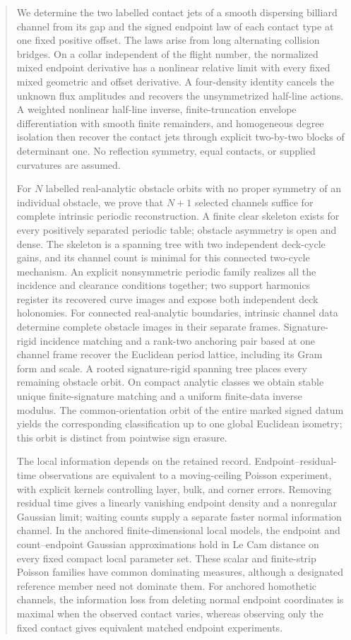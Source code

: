 \begin{abstract}
We determine the two labelled contact jets of a smooth dispersing billiard
channel from its gap and the signed endpoint law of each contact type at
one fixed positive offset.  The laws arise from long alternating collision
bridges.  On a collar independent of the flight number, the normalized
mixed endpoint derivative has a nonlinear relative limit with every fixed
mixed geometric and offset derivative.  A four-density identity cancels
the unknown flux amplitudes and recovers the unsymmetrized half-line
actions.  A weighted nonlinear half-line inverse, finite-truncation
envelope differentiation with smooth finite remainders, and homogeneous
degree isolation then recover the contact jets through explicit
two-by-two blocks of determinant one.  No reflection symmetry, equal
contacts, or supplied curvatures are assumed.

For $N$ labelled real-analytic obstacle orbits with no proper symmetry of an individual
obstacle, we prove that $N+1$ selected channels suffice for complete intrinsic
periodic reconstruction.  A finite clear skeleton exists for every
positively separated periodic table; obstacle asymmetry is open and dense.
The skeleton is a spanning tree with two independent deck-cycle gains, and
its channel count is minimal for this connected two-cycle mechanism.
An explicit nonsymmetric periodic family realizes all the incidence and
clearance conditions together; two support harmonics register its recovered
curve images and expose both independent deck holonomies.
For connected real-analytic boundaries, intrinsic channel data determine
complete obstacle images in their separate frames.  Signature-rigid incidence
matching and a rank-two anchoring pair based at one channel frame recover
the Euclidean period lattice, including its Gram form and scale.  A rooted
signature-rigid spanning tree places every remaining obstacle orbit.  On compact analytic
classes we obtain stable unique finite-signature matching and a uniform
finite-data inverse modulus.  The common-orientation orbit of the entire
marked signed datum yields the corresponding classification up to one global
Euclidean isometry; this orbit is distinct from pointwise sign erasure.

The local information depends on the retained record.  Endpoint--residual-time
observations are equivalent to a moving-ceiling Poisson experiment, with
explicit kernels controlling layer, bulk, and corner errors.  Removing
residual time gives a linearly vanishing endpoint density and a nonregular
Gaussian limit; waiting counts supply a separate faster normal information
channel.  In the anchored finite-dimensional local models, the endpoint and
count--endpoint Gaussian approximations hold in Le Cam distance on every
fixed compact local parameter set.  These scalar and finite-strip Poisson
families have common dominating measures, although a designated reference
member need not dominate them.  For anchored homothetic channels, the
information loss from deleting normal endpoint coordinates is maximal when
the observed contact varies, whereas observing only the fixed contact gives
equivalent matched endpoint experiments.


\end{abstract}
